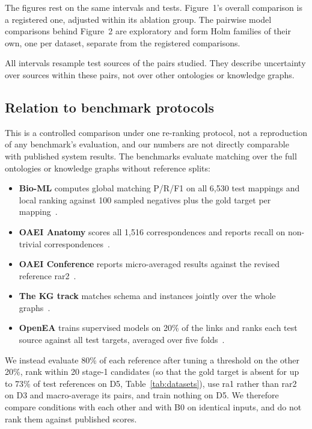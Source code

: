 The figures rest on the same intervals and tests. Figure~1's overall
comparison is a registered one, adjusted within its ablation group. The
pairwise model comparisons behind Figure~2 are exploratory and form Holm
families of their own, one per dataset, separate from the registered
comparisons.

All intervals resample test sources of the pairs studied. They describe
uncertainty over sources within these pairs, not over other ontologies or
knowledge graphs.

\subsection{Relation to benchmark protocols}
\label{sec:comparability}

This is a controlled comparison under one re-ranking protocol, not a
reproduction of any benchmark's evaluation, and our numbers are not directly
comparable with published system results. The benchmarks evaluate matching
over the full ontologies or knowledge graphs without reference splits:

\begin{itemize}
\item \textbf{Bio-ML} computes global matching P/R/F1 on all 6,530 test
  mappings and local ranking against 100 sampled negatives plus the gold
  target per mapping~\cite{he2022bioml}.
\item \textbf{OAEI Anatomy} scores all 1,516 correspondences and reports
  recall on non-trivial correspondences~\cite{oaei2024anatomy}.
\item \textbf{OAEI Conference} reports micro-averaged results against the
  revised reference rar2~\cite{oaei2024conference}.
\item \textbf{The KG track} matches schema and instances jointly over the
  whole graphs~\cite{hertling2020kgtrack}.
\item \textbf{OpenEA} trains supervised models on 20\% of the links and ranks
  each test source against all test targets, averaged over five
  folds~\cite{sun2020openea}.
\end{itemize}

We instead evaluate 80\% of each reference after tuning a threshold on the
other 20\%, rank within 20 stage-1 candidates (so that the gold target is
absent for up to 73\% of test references on D5, Table~\ref{tab:datasets}),
use ra1 rather than rar2 on D3 and macro-average its pairs, and train
nothing on D5. We therefore compare conditions with each other and with B0
on identical inputs, and do not rank them against published scores.
